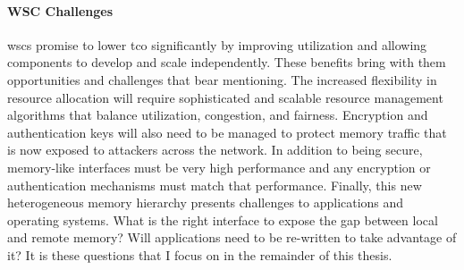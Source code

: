 \paragraph{WSC Challenges} \Glspl{wsc} promise to lower \gls{tco} significantly
by improving utilization and allowing components to develop and scale
independently. These benefits bring with them opportunities and challenges that
bear mentioning. The increased flexibility in resource allocation will require
sophisticated and scalable resource management algorithms that balance
utilization, congestion, and fairness. Encryption and authentication keys will
also need to be managed to protect memory traffic that is now exposed to
attackers across the network. In addition to being secure, memory-like
interfaces must be very high performance and any encryption or authentication
mechanisms must match that performance.  Finally, this new heterogeneous memory
hierarchy presents challenges to applications and operating systems. What is
the right interface to expose the gap between local and remote memory? Will
applications need to be re-written to take advantage of it? It is these
questions that I focus on in the remainder of this thesis.

